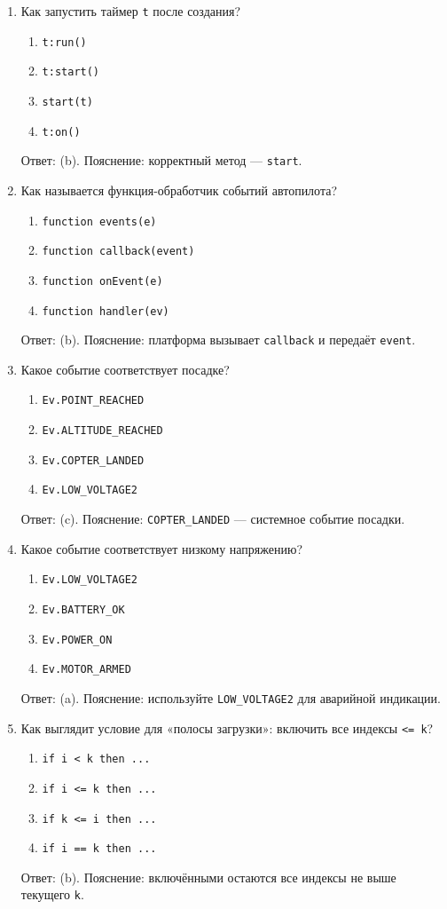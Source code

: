 \begin{enumerate}
  \item Как запустить таймер \verb|t| после создания?
  \begin{enumerate}[label=(\alph*)]
    \item \verb|t:run()| \item \verb|t:start()| \item \verb|start(t)| \item \verb|t:on()|
  \end{enumerate}
  Ответ: (b). Пояснение: корректный метод — \verb|start|.

  \item Как называется функция-обработчик событий автопилота?
  \begin{enumerate}[label=(\alph*)]
    \item \verb|function events(e)| \item \verb|function callback(event)| \item \verb|function onEvent(e)| \item \verb|function handler(ev)|
  \end{enumerate}
  Ответ: (b). Пояснение: платформа вызывает \verb|callback| и передаёт \verb|event|.

  \item Какое событие соответствует посадке?
  \begin{enumerate}[label=(\alph*)]
    \item \verb|Ev.POINT_REACHED| \item \verb|Ev.ALTITUDE_REACHED| \item \verb|Ev.COPTER_LANDED| \item \verb|Ev.LOW_VOLTAGE2|
  \end{enumerate}
  Ответ: (c). Пояснение: \verb|COPTER_LANDED| — системное событие посадки.

  \item Какое событие соответствует низкому напряжению?
  \begin{enumerate}[label=(\alph*)]
    \item \verb|Ev.LOW_VOLTAGE2| \item \verb|Ev.BATTERY_OK| \item \verb|Ev.POWER_ON| \item \verb|Ev.MOTOR_ARMED|
  \end{enumerate}
  Ответ: (a). Пояснение: используйте \verb|LOW_VOLTAGE2| для аварийной индикации.

  \item Как выглядит условие для «полосы загрузки»: включить все индексы \verb|<= k|?
  \begin{enumerate}[label=(\alph*)]
    \item \verb|if i < k then ...| \item \verb|if i <= k then ...| \item \verb|if k <= i then ...| \item \verb|if i == k then ...|
  \end{enumerate}
  Ответ: (b). Пояснение: включёнными остаются все индексы не выше текущего \verb|k|.


\end{enumerate}
